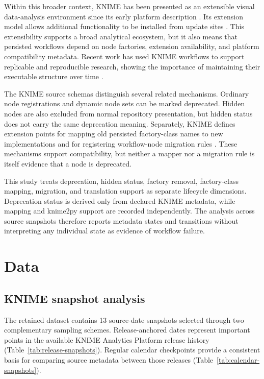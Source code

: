 \documentclass[runningheads]{llncs}
\begin{document}
Within this broader context, KNIME has been presented as an extensible visual
data-analysis environment
since its early platform description \cite{Berthold2009KNIME}. Its extension
model allows additional functionality to be installed from update sites
\cite{KNIMEExtensions2026}. This extensibility supports a broad analytical
ecosystem, but it also means that persisted workflows depend on node factories,
extension availability, and platform compatibility metadata. Recent work has
used KNIME workflows to support replicable and reproducible research, showing
the importance of maintaining their executable structure over time
\cite{Fu2025GIScienceKNIME}.

The KNIME source schemas distinguish several related mechanisms. Ordinary node
registrations and dynamic node sets can be marked deprecated. Hidden nodes are
also excluded from normal repository presentation, but hidden status does not
carry the same deprecation meaning. Separately, KNIME defines extension points
for mapping old persisted factory-class names to new implementations and for
registering workflow-node migration rules
\cite{KNIMECoreClassMapperSchema2026,KNIMEMigrationRuleSchema2026}. These
mechanisms support compatibility, but neither a mapper nor a migration rule is
itself evidence that a node is deprecated.

This study treats deprecation, hidden status, factory removal, factory-class
mapping, migration, and translation support as separate lifecycle dimensions.
Deprecation status is derived only from declared KNIME metadata, while mapping
and knime2py support are recorded independently. The analysis across source
snapshots therefore reports metadata states and transitions without
interpreting any individual state as evidence of workflow failure.

\section{Data}

\subsection{KNIME snapshot analysis}

The retained dataset contains 13 source-date snapshots selected through two
complementary sampling schemes. Release-anchored dates represent important
points in the available KNIME Analytics Platform release history
(Table~\ref{tab:release-snapshots}). Regular calendar checkpoints provide a
consistent basis for comparing source metadata between those releases
(Table~\ref{tab:calendar-snapshots}).
\end{document}
